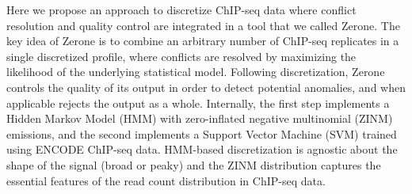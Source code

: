 \documentclass{bioinfo}
\begin{document}
Here we propose an approach to discretize ChIP-seq data where conflict
resolution and quality control are integrated in a tool that we called
Zerone. The key idea of Zerone is to combine an arbitrary number of
ChIP-seq replicates in a single discretized profile, where conflicts are
resolved by maximizing the likelihood of the underlying statistical model.
Following discretization, Zerone controls the quality of its output in
order to detect potential anomalies, and when applicable rejects the
output as a whole. Internally, the first step implements a Hidden Markov
Model (HMM) with zero-inflated negative multinomial (ZINM) emissions, and
the second implements a Support Vector Machine (SVM) trained using ENCODE
ChIP-seq data. HMM-based discretization is agnostic about
the shape of the signal (broad or peaky) and the ZINM distribution captures
the essential features of the read count distribution in ChIP-seq data.
\end{document}
